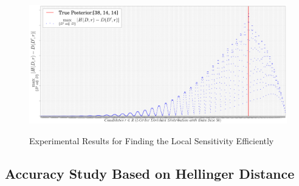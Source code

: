  \begin{figure}[h]
\centering
\includegraphics[width=1.0\textwidth]{efficiency}
\label{fig_efficiency}
\caption{Experimental Results for Finding the Local Sensitivity Efficiently}
\end{figure}

\subsection{Accuracy Study Based on Hellinger Distance}

